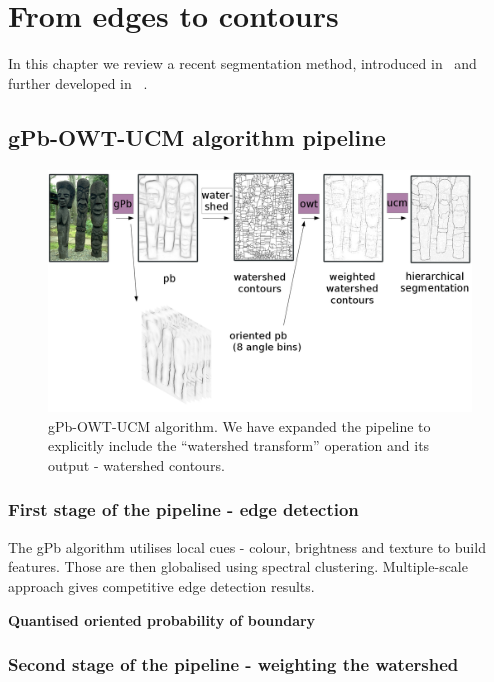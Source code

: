 \chapter{From edges to contours} %
\label{Chapter3}

In this chapter we review a recent segmentation method, introduced in~\cite{Arbelaez09} and further developed %
in ~\cite{Arbelaez11}.

\section{gPb-OWT-UCM algorithm pipeline}
\begin{figure}[ht!]
\centering
 \includegraphics[width=1\textwidth]{images/gPb-OWT-UCM/gPb-OWT-UCM_pipeline.png}
\caption{gPb-OWT-UCM algorithm. We have expanded the pipeline to explicitly include the ``watershed transform'' operation and its output - watershed contours.}
\label{fig:gPb-OWT-UCM-pipeline}
\end{figure}

\subsection{First stage of the pipeline - edge detection} %
The gPb algorithm utilises local cues - colour, brightness and texture to build features. Those are then globalised using spectral clustering. Multiple-scale approach gives competitive edge detection results.

\textbf{Quantised oriented probability of boundary}
\subsection{Second stage of the pipeline - weighting the watershed} %
